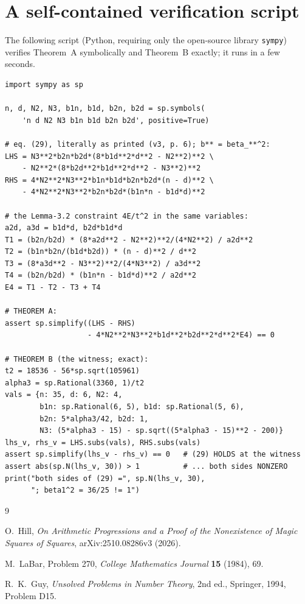 \documentclass[11pt]{amsart}
\theoremstyle{remark}
\begin{document}
\appendix

\section{A self-contained verification script}\label{app:script}

The following script (Python, requiring only the open-source library
\texttt{sympy}) verifies Theorem~A symbolically and Theorem~B exactly;
it runs in a few seconds.

\begin{footnotesize}
\begin{verbatim}
import sympy as sp

n, d, N2, N3, b1n, b1d, b2n, b2d = sp.symbols(
    'n d N2 N3 b1n b1d b2n b2d', positive=True)

# eq. (29), literally as printed (v3, p. 6); b** = beta_**^2:
LHS = N3**2*b2n*b2d*(8*b1d**2*d**2 - N2**2)**2 \
    - N2**2*(8*b2d**2*b1d**2*d**2 - N3**2)**2
RHS = 4*N2**2*N3**2*b1n*b1d*b2n*b2d*(n - d)**2 \
    - 4*N2**2*N3**2*b2n*b2d*(b1n*n - b1d*d)**2

# the Lemma-3.2 constraint 4E/t^2 in the same variables:
a2d, a3d = b1d*d, b2d*b1d*d
T1 = (b2n/b2d) * (8*a2d**2 - N2**2)**2/(4*N2**2) / a2d**2
T2 = (b1n*b2n/(b1d*b2d)) * (n - d)**2 / d**2
T3 = (8*a3d**2 - N3**2)**2/(4*N3**2) / a3d**2
T4 = (b2n/b2d) * (b1n*n - b1d*d)**2 / a2d**2
E4 = T1 - T2 - T3 + T4

# THEOREM A:
assert sp.simplify((LHS - RHS)
                   - 4*N2**2*N3**2*b1d**2*b2d**2*d**2*E4) == 0

# THEOREM B (the witness; exact):
t2 = 18536 - 56*sp.sqrt(105961)
alpha3 = sp.Rational(3360, 1)/t2
vals = {n: 35, d: 6, N2: 4,
        b1n: sp.Rational(6, 5), b1d: sp.Rational(5, 6),
        b2n: 5*alpha3/42, b2d: 1,
        N3: (5*alpha3 - 15) - sp.sqrt((5*alpha3 - 15)**2 - 200)}
lhs_v, rhs_v = LHS.subs(vals), RHS.subs(vals)
assert sp.simplify(lhs_v - rhs_v) == 0   # (29) HOLDS at the witness
assert abs(sp.N(lhs_v, 30)) > 1          # ... both sides NONZERO
print("both sides of (29) =", sp.N(lhs_v, 30),
      "; beta1^2 = 36/25 != 1")
\end{verbatim}
\end{footnotesize}

\begin{thebibliography}{9}

 O.~Hill, \emph{On Arithmetic Progressions and a Proof
of the Nonexistence of Magic Squares of Squares}, arXiv:2510.08286v3
(2026).

 M.~LaBar, Problem 270, \emph{College Mathematics
Journal} \textbf{15} (1984), 69.

 R.~K.~Guy, \emph{Unsolved Problems in Number Theory},
2nd ed., Springer, 1994, Problem D15.

\end{thebibliography}
\end{document}
